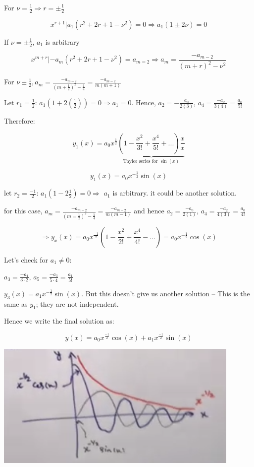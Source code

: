 \documentclass{article}
\begin{document}
For $\nu = \frac{1}{2} \Rightarrow r = \pm \frac{1}{2}$

$$x^{r+1} | a_1 (r^2 + 2r + 1 - \nu^2) = 0 \Rightarrow a_1 (1 \pm 2 \nu) = 0$$

If $\nu = \pm \frac{1}{2}$, $a_1$ is arbitrary

$$x^{m+r} | -a_m (r^2 + 2r + 1 - \nu^2) = a_{m=2} \Rightarrow a_m = \frac{-a_{m-2}}{(m+r)^2 - \nu^2}$$

For $\nu \pm \frac{1}{2}, a_m = \frac{-a_{m-2}}{(m+\frac{1}{2})^2 - \frac{1}{4}} = \frac{-a_{m-2}}{m(m+1)}$

\begin{center}
Let $r_1 = \frac{1}{2}$: $a_1 (1 + 2 (\frac{1}{2})) = 0 \Rightarrow a_1 = 0$. Hence, $a_2 = - \frac{a_0}{2(3)}$, $a_4 = \frac{-a_2}{3(4)} = \frac{a_0}{5!}$
\end{center}

Therefore:

$$y_1 (x) = a_0 x^{\frac{1}{2}} \underbrace{\left(1 - \frac{x^2}{3!} + \frac{x^4}{5!} + ... \right) \frac{x}{x}}_{\text{Taylor series for } \sin(x)}$$

$$y_1(x) = a_0 x^{- \frac{1}{2}} \sin(x)$$

let $r_2 = \frac{-1}{2}$: $a_1 (1 - 2 \frac{1}{2}) = 0 \Rightarrow$ $a_1$ is arbitrary. it could be another solution.


for this case, $a_m = \frac{-a_{m - 2}}{(m = \frac{1}{2})^2 - \frac{1}{4}} = \frac{-a_{m - 2}}{m(m-1)}$ and hence $a_2 = \frac{-a_0}{2(1)}$, $a_4 = \frac{-a_2}{4(3)} = \frac{a_0}{4!}$

$$\Rightarrow y_x(x) = a_0 x^{\frac{-1}{2}} \left(1 - \frac{x^2}{2!} + \frac{x^4}{4!} - ... \right) = a_0 x^{- \frac{1}{2}} \cos(x)$$

Let's check for $a_1 \neq 0$:

$a_3 = \frac{-a_1}{3 \cdot 2}$, $a_5 = \frac{-a_3}{5 \cdot 4} = \frac{a_1}{5!}$

$y_3 (x) = a_1 x^{- \frac{1}{2}} \sin(x)$. But this doesn't give us another solution -- This is the same as $y_1$; they are not independent. 

Hence we write the final solution as:

$$y(x) = a_0 x^{\frac{-1}{2}} \cos(x) + a_1 x^{\frac{-1}{2}} \sin(x)$$

\includegraphics[width = 0.9 \textwidth]{image5.png}
\end{document}
